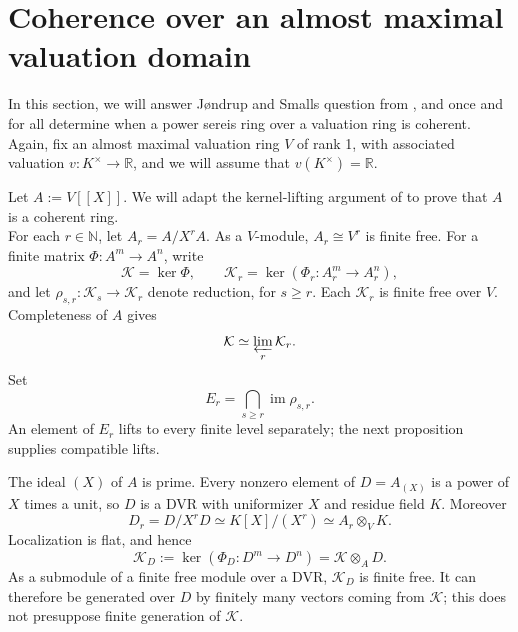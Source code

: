 \documentclass[12pt]{amsart}
\theoremstyle{plain}
\begin{document}
\section{Coherence over an almost maximal valuation domain}
\label{am:section}

\noindent In this section, we will answer J{\o}ndrup and Smalls question from \cite{JondrupSmall}, and once and for all determine when a power sereis ring over a valuation ring is coherent. Again, fix an almost maximal valuation ring $V$ of rank 1, with associated valuation $v:K^\times\to\mathbb{R}$, and we will assume that $v(K^\times)=\mathbb{R}$.

Let $A:=V[[X]]$. We will adapt the kernel-lifting argument of \cite[Section~3]{Wang} to prove that $A$ is a coherent ring.\\


\noindent For each $r\in\mathbb{N}$, let $A_r=A/X^rA$. As a $V$-module, $A_r\cong V^r$ is finite free.
For a finite matrix $\Phi:A^m\to A^n$, write
\[
\mathcal K=\ker\Phi,\qquad
\mathcal K_r=\ker(\Phi_r:A_r^m\to A_r^n),
\]
and let $\rho_{s,r}:\mathcal K_s\to\mathcal K_r$ denote reduction,
for $s\ge r$. Each $\mathcal K_r$ is finite free over $V$.  Completeness of $A$ gives
\begin{equation}\label{am:limit}
\mathcal K\simeq\varprojlim_r\mathcal K_r.
\end{equation}
Set
\[
E_r=\bigcap_{s\ge r}\operatorname{im}\rho_{s,r}.
\]
An element of $E_r$ lifts to every finite level separately; the next
proposition supplies compatible lifts.

The ideal $(X)$ of $A$ is prime. Every nonzero element of
$D=A_{(X)}$ is a power of $X$ times a unit, so $D$ is a DVR with
uniformizer $X$ and residue field $K$. Moreover
\[
D_r=D/X^rD\simeq K[X]/(X^r)\simeq A_r\otimes_V K.
\]
Localization is flat, and hence
\begin{equation}\label{am:generic}
\mathcal K_D:=\ker(\Phi_D:D^m\to D^n)=\mathcal K\otimes_A D.
\end{equation}
As a submodule of a finite free module over a DVR, $\mathcal K_D$
is finite free. It can therefore be generated over $D$ by finitely
many vectors coming from $\mathcal K$; this does not presuppose
finite generation of $\mathcal K$.
\end{document}
